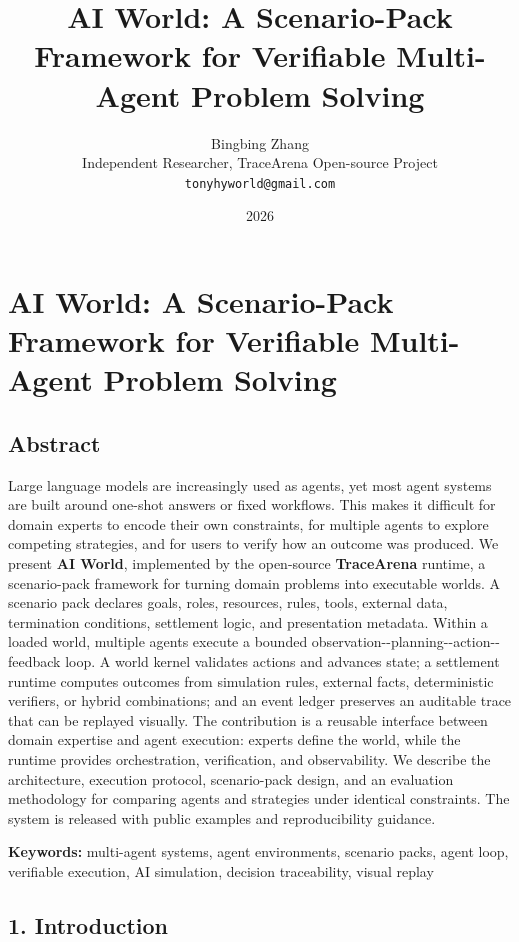 \documentclass[
]{article}
\title{AI World: A Scenario-Pack Framework for Verifiable Multi-Agent
Problem Solving}
\author{Bingbing Zhang\\Independent Researcher, TraceArena Open-source Project\\\texttt{tonyhyworld@gmail.com}}
\date{2026}
\begin{document}
\maketitle

\section{AI World: A Scenario-Pack Framework for Verifiable Multi-Agent
Problem
Solving}\label{ai-world-a-scenario-pack-framework-for-verifiable-multi-agent-problem-solving}

\subsection{Abstract}\label{abstract}

Large language models are increasingly used as agents, yet most agent
systems are built around one-shot answers or fixed workflows. This makes
it difficult for domain experts to encode their own constraints, for
multiple agents to explore competing strategies, and for users to verify
how an outcome was produced. We present \textbf{AI World}, implemented
by the open-source \textbf{TraceArena} runtime, a scenario-pack
framework for turning domain problems into executable worlds. A scenario
pack declares goals, roles, resources, rules, tools, external data,
termination conditions, settlement logic, and presentation metadata.
Within a loaded world, multiple agents execute a bounded
observation-\/-planning-\/-action-\/-feedback loop. A world kernel
validates actions and advances state; a settlement runtime computes
outcomes from simulation rules, external facts, deterministic verifiers,
or hybrid combinations; and an event ledger preserves an auditable trace
that can be replayed visually. The contribution is a reusable interface
between domain expertise and agent execution: experts define the world,
while the runtime provides orchestration, verification, and
observability. We describe the architecture, execution protocol,
scenario-pack design, and an evaluation methodology for comparing agents
and strategies under identical constraints. The system is released with
public examples and reproducibility guidance.

\textbf{Keywords:} multi-agent systems, agent environments, scenario
packs, agent loop, verifiable execution, AI simulation, decision
traceability, visual replay

\subsection{1. Introduction}\label{1-introduction}
\end{document}
